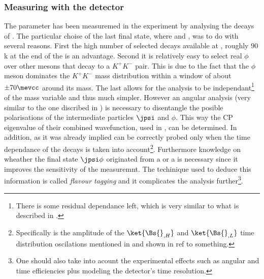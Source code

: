 \subsubsection{Measuring \phis with the \lhcb detector}
The parameter \phis has been measuremed in the \lhcb experiment by analysing the decays of .
The particular choise of the last final state, where \phiKK and \Jpsimumu, was to do with several reasons. First the high number
of selected \BsJpsiPhi decays available at \lhcb, roughly $90$k at the end of the \runtwo is an advantage. Second it is relatively easy
to select real $\phi$ over other mesons that decay to a $K^+K^-$ pair. This is due to the fact that the $\phi$ meson dominates the
$K^+K^-$ mass distribution within a window of about $\pm 70 \mevcc$ around its mass. The last allows for the analysis to be
independant\footnote{There is some residual dependance left, which is very similar to what is described in . }
of the \mkk mass variable and thus much simpler. However an angular analysis (very similar to the one discribed in  )
is necessary to disentangle the posible polarisations of the intermediate particles $\jpsi$ and $\phi$. This way the CP eigenvalue of their combined
wavefunction, used in , can be determined. In addition, as it was already implied \phis can be correctly probed only when the
time dependance of the \BsJpsiPhi decays is taken into
account\footnote{Specifically \phis is the amplitude of the $\ket{\Bs{}_{,H}}$ and $\ket{\Bs{}_{,L}}$ time distribution oscilations
mentioned in and shown in {\color{red} ref to something.} }.
Furthermore knowledge on wheather the final state $\jpsi\phi$ originated from a \Bs or a \Bsb is necessary since it
improves the sensitivity of the \phis measuremnt. The techinique used to deduce this information is called {\it flavour tagging}
and it complicates the analysis further\footnote{One should also take into acount the experimental effects such as angular and time efficiencies plus modeling the \lhcb detector's time resolution.}.

